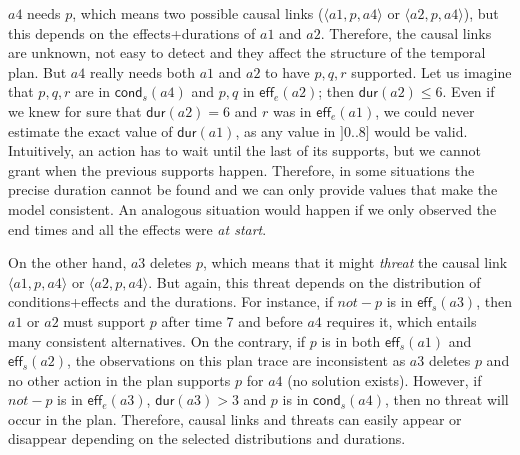\documentclass[10pt,journal,compsoc]{IEEEtran}
\newcommand{\tup}[1]{{\langle #1 \rangle}}
\newcommand{\eff}{\mathsf{eff}}    %
\newcommand{\cond}{\mathsf{cond}}  %
\newcommand{\dur}{\mathsf{dur}}    %
\begin{document}
$a4$ needs $p$, which means two possible causal links ($\tup{a1,p,a4}$ or $\tup{a2,p,a4}$), but 
this depends on the effects+durations of $a1$ and $a2$. Therefore, the causal links are unknown, not easy to detect and they affect the structure of the temporal plan. But $a4$ really needs both $a1$ and $a2$ to have $p,q,r$ supported. Let us imagine that $p,q,r$ are in $\cond_s(a4)$ and $p,q$ in $\eff_e(a2)$; then $\dur(a2) \leq 6$. Even if we knew for sure that $\dur(a2)=6$ and $r$ was in $\eff_e(a1)$, we could never estimate the exact value of $\dur(a1)$, as any value in $]0..8]$ would be valid. Intuitively, an action has to wait until the last of its supports, but we cannot grant when the previous supports happen. %
Therefore, in some situations the precise duration cannot be found and we can only provide values that make the model consistent.
An analogous situation would happen if we only observed the end times and all the effects were \textit{at start}.


On the other hand, $a3$ deletes $p$, which means that it might \emph{threat} the causal link $\tup{a1,p,a4}$ or $\tup{a2,p,a4}$. But again, this threat depends on the distribution of conditions+effects and the durations. For instance, if $not-p$ is in $\eff_s(a3)$, then $a1$ or $a2$ must support $p$ after time 7 and before $a4$ requires it, which entails many consistent alternatives. On the contrary, if $p$ is in both $\eff_s(a1)$ and $\eff_s(a2)$, the observations on this plan trace are inconsistent as $a3$ deletes $p$ and no other action in the plan supports $p$ for $a4$ (no solution exists). However, if $not-p$ is in $\eff_e(a3)$, $\dur(a3) > 3$ and $p$ is in $\cond_s(a4)$, then no threat will occur in the plan. Therefore, causal links and threats can easily appear or disappear depending on the selected distributions and durations.
\end{document}
